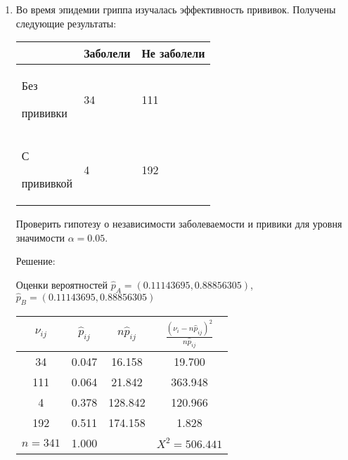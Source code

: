 \documentclass[a4paper,12pt]{article}
\begin{document}
\begin{enumerate}
      \item \cite[306]{Efimov} Во время эпидемии гриппа изучалась эффективность прививок. Получены следующие результаты:

            \begin{center}
                  \begin{tabular}{|P{3cm}|P{3cm}|P{3cm}|}
                        \hline
                                          & Заболели & Не заболели \\
                        \hline
                        Без \par прививки & 34       & 111         \\
                        \hline
                        С \par прививкой  & 4        & 192         \\
                        \hline
                  \end{tabular}
            \end{center}

            Проверить гипотезу о независимости заболеваемости и привики для уровня значимости $\alpha = 0.05$.

            Решение: \par
                  Оценки вероятностей $\widehat{p}_A = (0.11143695, 0.88856305)$, $\widehat{p}_B = (0.11143695, 0.88856305)$

                  \begin{tabular}{|c|c|c|c|}
                        \hline
                        $\nu_{ij}$ & $\widehat{p}_{ij}$ & $n \widehat{p}_{ij}$ & $\frac{(\nu_i - n \widehat{p}_{ij})^2}{n \widehat{p}_{ij}}$ \\
                        \hline
                        34         & 0.047              & 16.158               & 19.700                                                      \\
                        111        & 0.064              & 21.842               & 363.948                                                     \\
                        4          & 0.378              & 128.842              & 120.966                                                     \\
                        192        & 0.511              & 174.158              & 1.828                                                       \\
                        \hline
                        $n = 341$  & 1.000              &                      & $X^2 =  506.441$                                            \\
                        \hline
                  \end{tabular}


\end{enumerate}
\end{document}

